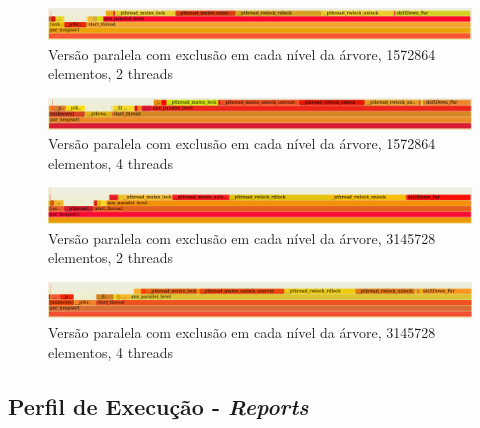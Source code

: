 \documentclass{article}
\begin{document}
\begin{figure}[H]
    \centering
    \includegraphics[width=18cm]{Pictures/par_1572864_2_level.png}
    \caption{Versão paralela com exclusão em cada nível da árvore, 1572864 elementos, 2 threads}
\end{figure}

\begin{figure}[H]
    \centering
    \includegraphics[width=18cm]{Pictures/par_1572864_4_level.png}
    \caption{Versão paralela com exclusão em cada nível da árvore, 1572864 elementos, 4 threads}
\end{figure}

\begin{figure}[H]
    \centering
    \includegraphics[width=18cm]{Pictures/par_3145728_2_level.png}
    \caption{Versão paralela com exclusão em cada nível da árvore, 3145728 elementos, 2 threads}
\end{figure}

\begin{figure}[H]
    \centering
    \includegraphics[width=18cm]{Pictures/par_3145728_4_level.png}
    \caption{Versão paralela com exclusão em cada nível da árvore, 3145728 elementos, 4 threads}
\end{figure}

\subsection{Perfil de Execução - \textit{Reports}}
\end{document}
